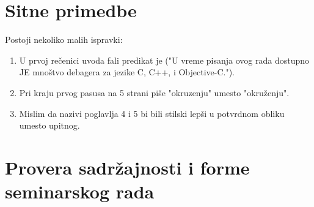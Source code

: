 \documentclass[a4paper]{report}
\begin{document}
\section{Sitne primedbe}
Postoji nekoliko malih ispravki:
\begin{enumerate}
\item  U prvoj rečenici uvoda fali predikat je ("U vreme pisanja ovog rada dostupno JE mnoštvo debagera za jezike C,
C++, i Objective-C."). 
\item Pri kraju prvog pasusa na 5 strani piše "okruzenju" umesto "okruženju". 
\item Mislim da nazivi poglavlja 4 i 5 bi bili stilski lepši u potvrdnom obliku umesto upitnog.  
\end{enumerate}

\section{Provera sadržajnosti i forme seminarskog rada}
\end{document}
